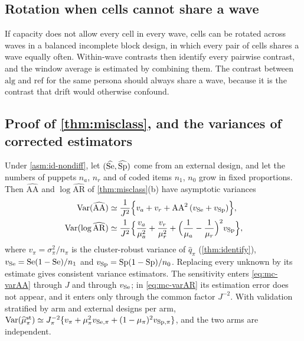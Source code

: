 \subsection{Rotation when cells cannot share a wave}\label{app:rotation}

If capacity does not allow every cell in every wave, cells can be rotated across waves in a balanced incomplete block design, in which every pair of cells shares a wave equally often. Within-wave contrasts then identify every pairwise contrast, and the window average is estimated by combining them. The contrast between $\mathrm{alg}$ and $\mathrm{ref}$ for the same persona should always share a wave, because it is the contrast that drift would otherwise confound.

\subsection{Proof of \texorpdfstring{\cref{thm:misclass}}{the misclassification theorem}, and the variances of corrected estimators}\label{app:pf-misclass}

\begin{proposition}\label{prop:mc-variance}
Under \cref{asm:id-nondiff}, let $(\widehat{\mathrm{Se}},\widehat{\mathrm{Sp}})$ come from an external design, and let the numbers of puppets $n_a$, $n_r$ and of coded items $n_1$, $n_0$ grow in fixed proportions. Then $\widehat{\mathrm{AA}}$ and $\log\widehat{\mathrm{AR}}$ of \cref{thm:misclass}(b) have asymptotic variances
\begin{align}
  \operatorname{Var}(\widehat{\mathrm{AA}})&\simeq\frac1{J^2}\Bigl\{v_a+v_r+\mathrm{AA}^2\,(v_{\mathrm{Se}}+v_{\mathrm{Sp}})\Bigr\},\label{eq:mc-varAA}\\
  \operatorname{Var}(\log\widehat{\mathrm{AR}})&\simeq\frac1{J^2}\Bigl\{\frac{v_a}{\mu_a^2}+\frac{v_r}{\mu_r^2}+\Bigl(\frac1{\mu_a}-\frac1{\mu_r}\Bigr)^2v_{\mathrm{Sp}}\Bigr\},\label{eq:mc-varAR}
\end{align}
where $v_\pi=\sigma^2_\pi/n_\pi$ is the cluster-robust variance of $\widehat q_\pi$ (\cref{thm:identify}), $v_{\mathrm{Se}}=\mathrm{Se}(1-\mathrm{Se})/n_1$ and $v_{\mathrm{Sp}}=\mathrm{Sp}(1-\mathrm{Sp})/n_0$. Replacing every unknown by its estimate gives consistent variance estimators. The sensitivity enters \eqref{eq:mc-varAA} through $J$ and through $v_{\mathrm{Se}}$; in \eqref{eq:mc-varAR} its estimation error does not appear, and it enters only through the common factor $J^{-2}$. With validation stratified by arm and external designs per arm, $\operatorname{Var}(\widehat\mu^{\mathrm{st}}_\pi)\simeq J_\pi^{-2}\{v_\pi+\mu_\pi^2v_{\mathrm{Se},\pi}+(1-\mu_\pi)^2v_{\mathrm{Sp},\pi}\}$, and the two arms are independent.
\end{proposition}

